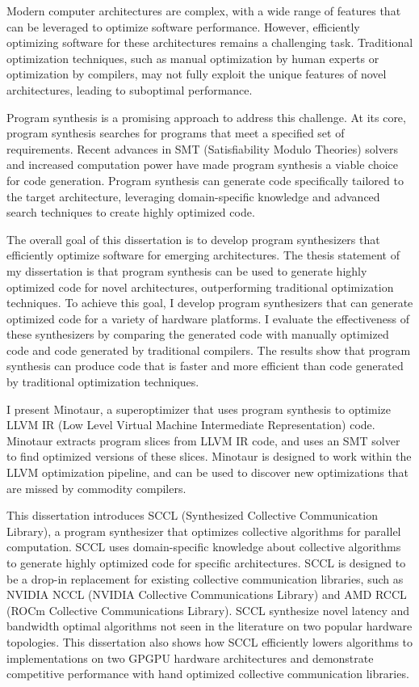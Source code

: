 Modern computer architectures are complex, with a wide range of
features that can be leveraged to optimize software performance.
However, efficiently optimizing software for these architectures
remains a challenging task. Traditional optimization techniques,
such as manual optimization by human experts or optimization by
compilers, may not fully exploit the unique features of novel
architectures, leading to suboptimal performance.

Program synthesis is a promising approach to address this challenge.
At its core, program synthesis searches for programs that meet a
specified set of requirements. Recent advances in SMT (Satisfiability
Modulo Theories) solvers and increased computation power have made
program synthesis a viable choice for code generation. Program
synthesis can generate code specifically tailored to the target
architecture, leveraging domain-specific knowledge and advanced search
techniques to create highly optimized code.

The overall goal of this dissertation is to develop program
synthesizers that efficiently optimize software for emerging
architectures. The thesis statement of my dissertation is that program
synthesis can be used to generate highly optimized code for novel
architectures, outperforming traditional optimization techniques. To
achieve this goal, I develop program synthesizers that can
generate optimized code for a variety of hardware platforms. I
evaluate the effectiveness of these synthesizers by comparing the
generated code with manually optimized code and code generated by
traditional compilers. The results show that program synthesis can
produce code that is faster and more efficient than code generated by
traditional optimization techniques.

I present Minotaur, a superoptimizer that uses program synthesis to
optimize LLVM IR (Low Level Virtual Machine Intermediate
Representation) code. Minotaur extracts program slices from LLVM IR
code, and uses an SMT solver to find optimized versions of these
slices. Minotaur is designed to work within the LLVM optimization
pipeline, and can be used to discover new optimizations that are
missed by commodity compilers.

This dissertation introduces SCCL (Synthesized Collective
Communication Library), a program synthesizer that optimizes
collective algorithms for parallel computation. SCCL uses
domain-specific knowledge about collective algorithms to generate
highly optimized code for specific architectures. SCCL is designed to
be a drop-in replacement for existing collective communication
libraries, such as NVIDIA NCCL (NVIDIA Collective Communications
Library) and AMD RCCL (ROCm Collective Communications Library). SCCL
synthesize novel latency and bandwidth optimal algorithms not seen in
the literature on two popular hardware topologies. This dissertation
also shows how SCCL efficiently lowers algorithms to implementations
on two GPGPU hardware architectures and demonstrate competitive
performance with hand optimized collective communication libraries.